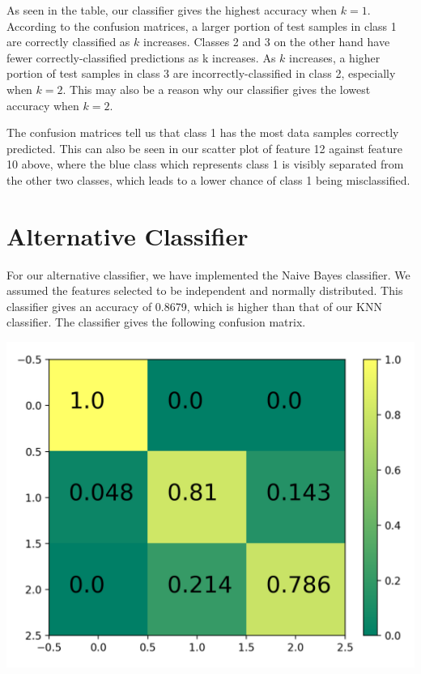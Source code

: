 \documentclass[11pt]{article}
\begin{document}
As seen in the table, our classifier gives the highest accuracy when $k = 1$. According to the confusion matrices, a larger portion of test samples in class 1 are correctly classified as $k$ increases. Classes 2 and 3 on the other hand have fewer correctly-classified predictions as k increases. As $k$ increases, a higher portion of test samples in class 3 are incorrectly-classified in class 2, especially when $k = 2$. This may also be a reason why our classifier gives the lowest accuracy when $k = 2$.

The confusion matrices tell us that class 1 has the most data samples correctly predicted. This can also be seen in our scatter plot of feature 12 against feature 10 above, where the blue class which represents class 1 is visibly separated from the other two classes, which leads to a lower chance of class 1 being misclassified.

\section{Alternative Classifier}
For our alternative classifier, we have implemented the Naive Bayes classifier. We assumed the features selected to be independent and normally distributed. This classifier gives an accuracy of 0.8679, which is higher than that of our KNN classifier. The classifier gives the following confusion matrix.

\begin{center}
\includegraphics[scale=0.2]{naive_bayes_matrix}
\end{center}
\end{document}
